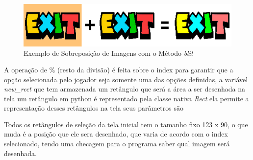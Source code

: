 \begin{figure}[h!]
    \centering
    \includegraphics[width=1\linewidth]{figuras/blit_example.png}
    \caption{Exemplo de Sobreposição de Imagens com o Método \textit{blit}}
    \label{fig:blit-example}
\end{figure}

A operação de \% (resto da divisão) é feita sobre o index para garantir que a opção selecionada pelo jogador seja somente uma das opções definidas, a variável \textit{new\_rect} que tem armazenada um retângulo que será a área a ser desenhada na tela um retângulo em python é representado pela classe nativa \textit{Rect} ela permite a representação desses retângulos na tela seus parâmetros são

Todos os retângulos de seleção da tela inicial tem o tamanho fixo 123 x 90, o que muda é a posição que ele sera desenhado, que varia de acordo com o index selecionado, tendo uma checagem para o programa saber qual imagem será desenhada.

